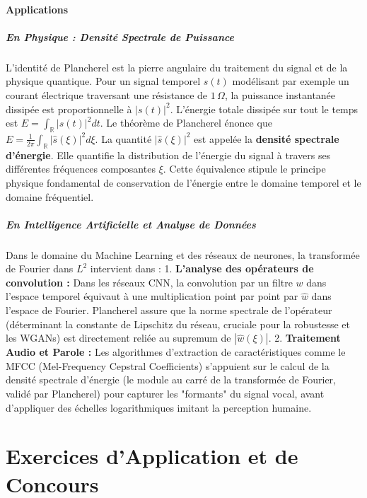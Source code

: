 \documentclass[11pt,a4paper]{article}
\begin{document}
\subsection*{Applications}

\subsubsection*{En Physique : Densité Spectrale de Puissance}

L'identité de Plancherel est la pierre angulaire du traitement du signal et de la physique quantique. Pour un signal temporel $s(t)$ modélisant par exemple un courant électrique traversant une résistance de $1\,\Omega$, la puissance instantanée dissipée est proportionnelle à $|s(t)|^2$.
L'énergie totale dissipée sur tout le temps est $E = \int_{\mathbb{R}} |s(t)|^2 dt$.
Le théorème de Plancherel énonce que $E = \frac{1}{2\pi} \int_{\mathbb{R}} |\hat{s}(\xi)|^2 d\xi$.
La quantité $|\hat{s}(\xi)|^2$ est appelée la \textbf{densité spectrale d'énergie}. Elle quantifie la distribution de l'énergie du signal à travers ses différentes fréquences composantes $\xi$. Cette équivalence stipule le principe physique fondamental de conservation de l'énergie entre le domaine temporel et le domaine fréquentiel.

\subsubsection*{En Intelligence Artificielle et Analyse de Données}

Dans le domaine du Machine Learning et des réseaux de neurones, la transformée de Fourier dans $L^2$ intervient dans :
1.  \textbf{L'analyse des opérateurs de convolution :} Dans les réseaux CNN, la convolution par un filtre $w$ dans l'espace temporel équivaut à une multiplication point par point par $\hat{w}$ dans l'espace de Fourier. Plancherel assure que la norme spectrale de l'opérateur (déterminant la constante de Lipschitz du réseau, cruciale pour la robustesse et les WGANs) est directement reliée au supremum de $|\hat{w}(\xi)|$.
2.  \textbf{Traitement Audio et Parole :} Les algorithmes d'extraction de caractéristiques comme le MFCC (Mel-Frequency Cepstral Coefficients) s'appuient sur le calcul de la densité spectrale d'énergie (le module au carré de la transformée de Fourier, validé par Plancherel) pour capturer les "formants" du signal vocal, avant d'appliquer des échelles logarithmiques imitant la perception humaine.


\newpage
\part{Exercices d'Application et de Concours}
\end{document}

